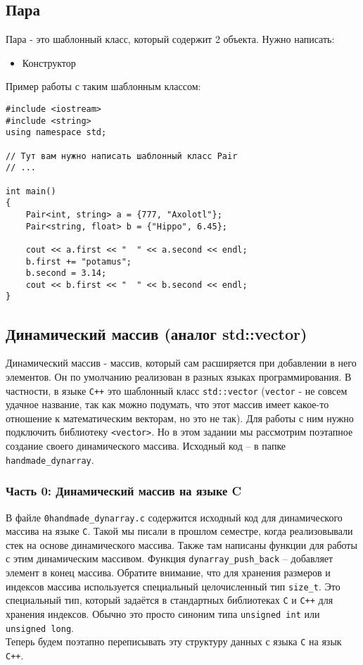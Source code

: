 \documentclass{article}
\begin{document}
\subsection*{Пара}
Пара - это шаблонный класс, который содержит 2 объекта. Нужно написать:
\begin{itemize}
\item Конструктор
\end{itemize}
Пример работы с таким шаблонным классом:
\begin{lstlisting}
#include <iostream>
#include <string> 
using namespace std;

// Тут вам нужно написать шаблонный класс Pair
// ...

int main() 
{
    Pair<int, string> a = {777, "Axolotl"};
    Pair<string, float> b = {"Hippo", 6.45};
    
    cout << a.first << "  " << a.second << endl;
    b.first += "potamus";
    b.second = 3.14;
    cout << b.first << "  " << b.second << endl;
}
\end{lstlisting}

\subsection*{Динамический массив (аналог std::vector)}
Динамический массив - массив, который сам расширяется при добавлении в него элементов. Он по умолчанию реализован в разных языках программирования. В частности, в языке \texttt{C++} это шаблонный класс \texttt{std::vector} (\texttt{vector} - не совсем удачное название, так как можно подумать, что этот массив имеет какое-то отношение к математическим векторам, но это не так). Для работы с ним нужно подключить библиотеку \texttt{<vector>}. Но в этом задании мы рассмотрим поэтапное создание своего динамического массива. Исходный код -- в папке \texttt{handmade\_dynarray}.
\subsubsection*{Часть 0: Динамический массив на языке C}
В файле \texttt{0handmade\_dynarray.c} содержится исходный код для динамического массива на языке \texttt{C}. Такой мы писали в прошлом семестре, когда реализовывали стек на основе динамического массива. Также там написаны функции для работы с этим динамическим массивом. Функция \texttt{dynarray\_push\_back} -- добавляет элемент в конец массива. Обратите внимание, что для хранения размеров и индексов массива используется специальный целочисленный тип \texttt{size\_t}. Это специальный тип, который задаётся в стандартных библиотеках \texttt{C} и \texttt{C++} для хранения индексов. Обычно это просто синоним типа \texttt{unsigned int} или \texttt{unsigned long}.\\
Теперь будем поэтапно переписывать эту структуру данных с языка \texttt{C} на язык \texttt{C++}.
\end{document}

